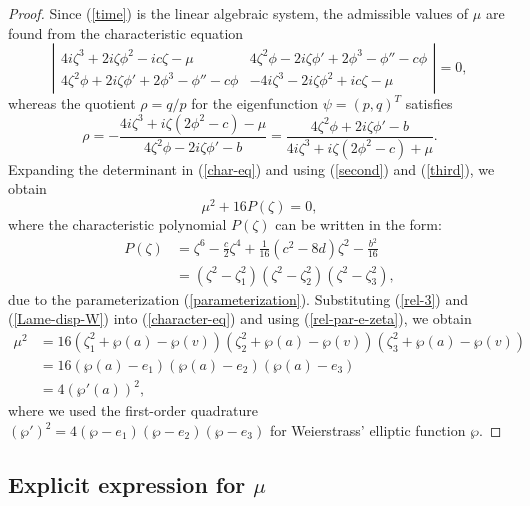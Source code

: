 \documentclass[12pt,reqno]{amsart}
\numberwithin{equation}{section}
\begin{document}
\begin{proof}
Since (\ref{time}) is the linear algebraic system, the admissible values of $\mu$ are found from the characteristic equation 
\begin{equation}
\label{char-eq}
\left| 
\begin{array}{ll} 4i\zeta^3+2i\zeta \phi^2 - ic \zeta - \mu & 4\zeta^2 \phi - 2i\zeta \phi' + 2\phi^3 - \phi'' - c \phi \\ 4\zeta^2 \phi + 2i \zeta \phi' + 2 \phi^3 - \phi'' - c\phi & -4i\zeta^3-2i\zeta \phi^2 + i c \zeta - \mu \end{array} 
\right| = 0, 
\end{equation}
whereas the quotient $\rho = q/p$ for the eigenfunction $\psi = (p,q)^T$ satisfies  
\begin{equation}
\label{rho-basic}
\rho = -\frac{4 i \zeta^3 + i \zeta (2 \phi^2 - c) - \mu}{4 \zeta^2 \phi - 2 i \zeta \phi' - b} = \frac{4 \zeta^2 \phi + 2 i \zeta \phi' - b}{4 i \zeta^3 + i \zeta (2 \phi^2 - c) + \mu}.
\end{equation}
Expanding the determinant in (\ref{char-eq}) and using (\ref{second}) and (\ref{third}), we obtain
\begin{equation}
\label{character-eq}
\mu^2 + 16 P(\zeta) = 0,
\end{equation}
where the characteristic polynomial $P(\zeta)$ can be written in the form:
\begin{align*}
P(\zeta) &= \zeta^6 - \frac{c}{2} \zeta^4 + \frac{1}{16} (c^2 - 8d) \zeta^2 - \frac{b^2}{16} \\
&= (\zeta^2 - \zeta_1^2) (\zeta^2 - \zeta_2^2) (\zeta^2 - \zeta_3^2),
\end{align*}
due to the parameterization (\ref{parameterization}). 
Substituting (\ref{rel-3}) and (\ref{Lame-disp-W}) into (\ref{character-eq}) and using (\ref{rel-par-e-zeta}), we obtain 
\begin{align*}
\mu^2 &= 16 (\zeta_1^2 + \wp(a) - \wp(v)) (\zeta_2^2 + \wp(a) - \wp(v)) (\zeta_3^2 + \wp(a) - \wp(v)) \\
&= 16 (\wp(a) - e_1) (\wp(a) - e_2) (\wp(a) - e_3) \\
&= 4 (\wp'(a))^2,
\end{align*}
where we used the first-order quadrature $(\wp')^2 = 4 (\wp - e_1) (\wp - e_2) (\wp - e_3)$ for Weierstrass' elliptic function $\wp$. 
\end{proof}

\subsection{Explicit expression for $\mu$}
\label{sec-3-3}
\end{document}

